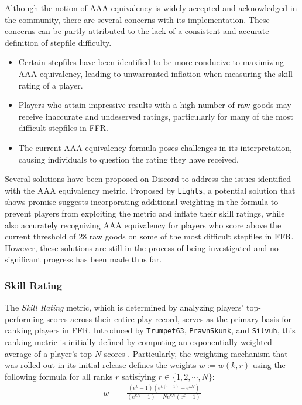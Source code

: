 

Although the notion of AAA equivalency is widely accepted and acknowledged in the community, there are several concerns with its implementation. These concerns can be partly attributed to the lack of a consistent and accurate definition of stepfile difficulty.

\begin{itemize}
	\item Certain stepfiles have been identified to be more conducive to maximizing AAA equivalency, leading to unwarranted inflation when measuring the skill rating of a player.
	\item Players who attain impressive results with a high number of raw goods may receive inaccurate and undeserved ratings, particularly for many of the most difficult stepfiles in FFR.
	\item The current AAA equivalency formula poses challenges in its interpretation, causing individuals to question the rating they have received.
\end{itemize}

Several solutions have been proposed on Discord to address the issues identified with the AAA equivalency metric. Proposed by \texttt{Lights}, a potential solution that shows promise suggests incorporating additional weighting in the formula to prevent players from exploiting the metric and inflate their skill ratings, while also accurately recognizing AAA equivalency for players who score above the current threshold of 28 raw goods on some of the most difficult stepfiles in FFR. However, these solutions are still in the process of being investigated and no significant progress has been made thus far.

\subsubsection{Skill Rating}

The \textit{Skill Rating} metric, which is determined by analyzing players' top-performing scores across their entire play record, serves as the primary basis for ranking players in FFR. Introduced by \texttt{Trumpet63}, \texttt{PrawnSkunk}, and \texttt{Silvuh}, this ranking metric is initially defined by computing an exponentially weighted average of a player's top $N$ scores \cite{20150216}. Particularly, the weighting mechanism that was rolled out in its initial release defines the weights $w := w(k, r)$ using the following formula for all ranks $r$ satisfying $r \in \{1, 2, \cdots, N\}$:
\begin{align*}
	w & = \frac{(e^k - 1)(e^{k(r-1)} - e^{kN})}{(e^{kN} - 1) - Ne^{kN}(e^k - 1)} 
\end{align*}


